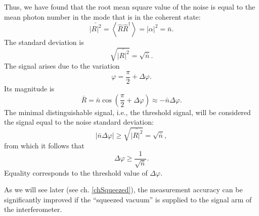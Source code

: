 Thus, we have found that the root mean square value of the noise is equal to
the mean photon number in the mode that is in the coherent state:
\begin{equation}
\bar{\left|R\right|^2} = 
\left<\hat{R}\hat{R}^{\dag}\right> = 
\left|\alpha\right|^2 =
\bar{n}.
\nonumber
\end{equation}
The standard deviation is
\begin{equation}
\sqrt{\bar{\left|R\right|^2}} = 
\sqrt{\bar{n}}.
\nonumber
\end{equation}
The signal arises due to the variation
\[
\varphi = \frac{\pi}{2} + \Delta \varphi.
\]
Its magnitude is
\[
\bar{R} = \bar{n} \cos\left(\frac{\pi}{2} + \Delta \varphi\right) \approx
- \bar{n} \Delta \varphi.
\]
The minimal distinguishable signal, i.e., the threshold signal, will be
considered the signal equal to the noise standard deviation:
\[
\left|\bar{n} \Delta \varphi\right| \ge
\sqrt{\bar{\left|R\right|^2}} = 
\sqrt{\bar{n}},
\]
from which it follows that
\[
\Delta \varphi  \ge \frac{1}{\sqrt{\bar{n}}}.
\]
Equality corresponds to the threshold value of $\Delta \varphi$.

As we will see later (see ch. \ref{chSqueezed}), the measurement accuracy
can be significantly improved if the ``squeezed vacuum'' is supplied
to the signal arm of the interferometer.  


